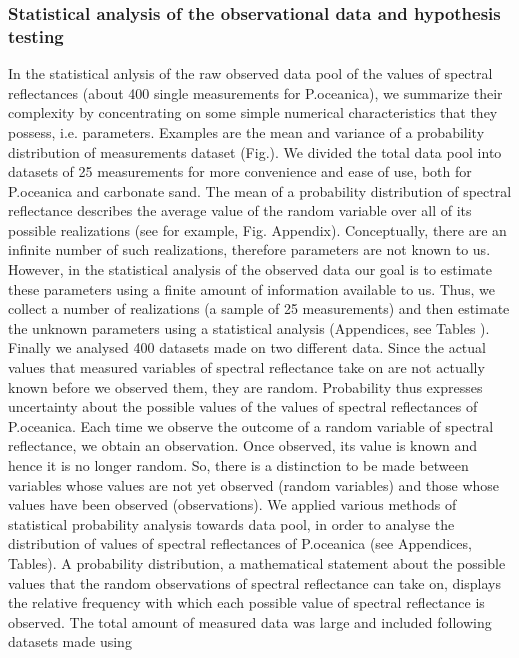 \documentclass[10pt, a4paper]{article}
\begin{document}
\subsubsection{Statistical analysis of the observational data and hypothesis testing}
In the statistical anlysis of the raw observed data pool of the values of spectral reflectances (about 400 single measurements for P.oceanica), we summarize their complexity by concentrating on some simple numerical characteristics that they possess, i.e. parameters. Examples are the mean and variance of a probability distribution of measurements dataset (Fig.). We divided the total data pool into datasets of 25 measurements for more convenience and ease of use, both for P.oceanica and carbonate sand. The mean of a probability distribution of spectral reflectance describes the average value of the random variable over all of its possible realizations (see for example, Fig. Appendix).  Conceptually, there are an infinite number of such realizations, therefore parameters are not known to us. However, in the statistical analysis of the observed data our goal is to estimate these parameters using a finite amount of information available to us. 
Thus, we collect a number of realizations (a sample of 25 measurements) and then estimate the unknown parameters using a statistical analysis (Appendices, see Tables ). \\
Finally we
analysed 400 datasets made on two different data. 
Since the actual values that measured variables of spectral reflectance take on are not actually known before we observed them, they are random. 
Probability thus expresses uncertainty about the possible values of the values of spectral reflectances  of P.oceanica.
Each time we observe the outcome of a random variable of spectral reflectance, we obtain an observation. 
Once observed, its value is known and hence it is no longer random. 
So, there is a distinction to be made between variables whose values are not yet observed (random variables) and those whose values have been observed (observations). 
We applied various methods of statistical probability analysis towards data pool, in order to analyse the distribution of values of spectral reflectances of P.oceanica (see Appendices, Tables). 
A probability distribution, a mathematical statement about the possible values that the random observations of spectral reflectance can take on, displays the relative frequency with which each possible value of spectral reflectance is observed.
The total amount of measured data was large and included following datasets made using
\end{document}
